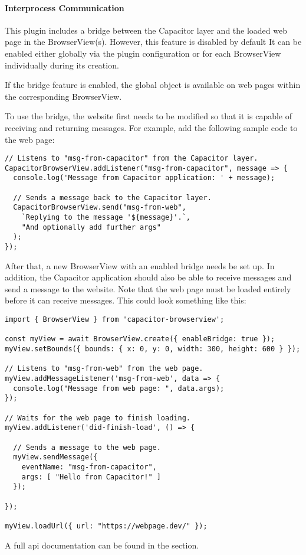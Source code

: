 \newpage

\paragraph{Interprocess Communication}
\label{sec:Capacitor-BrowserView:InterprocessCommunication}

This plugin includes a bridge between the Capacitor layer and the loaded web page in the BrowserView(s).
However, this feature is disabled by default
It can be enabled either globally via the plugin configuration or for each BrowserView individually during its creation.

If the bridge feature is enabled, the global object  is available on web pages within the corresponding BrowserView.

To use the bridge, the website first needs to be modified so that it is capable of receiving and returning messages.
For example, add the following sample code to the web page:

\begin{verbatim}
// Listens to "msg-from-capacitor" from the Capacitor layer.
CapacitorBrowserView.addListener("msg-from-capacitor", message => {
  console.log('Message from Capacitor application: ' + message);

  // Sends a message back to the Capacitor layer.
  CapacitorBrowserView.send("msg-from-web",
    `Replying to the message '${message}'.`,
    "And optionally add further args"
  );
});
\end{verbatim}

After that, a new BrowserView with an enabled bridge needs be set up.
In addition, the Capacitor application should also be able to receive messages and send a message to the website.
Note that the web page must be loaded entirely before it can receive messages.
This could look something like this:

\begin{verbatim}
import { BrowserView } from 'capacitor-browserview';

const myView = await BrowserView.create({ enableBridge: true });
myView.setBounds({ bounds: { x: 0, y: 0, width: 300, height: 600 } });

// Listens to "msg-from-web" from the web page.
myView.addMessageListener('msg-from-web', data => {
  console.log("Message from web page: ", data.args);
});

// Waits for the web page to finish loading.
myView.addListener('did-finish-load', () => {

  // Sends a message to the web page.
  myView.sendMessage({
    eventName: "msg-from-capacitor",
    args: [ "Hello from Capacitor!" ]
  });

});

myView.loadUrl({ url: "https://webpage.dev/" });
\end{verbatim}

A full \ac{api} documentation can be found in the  section.
